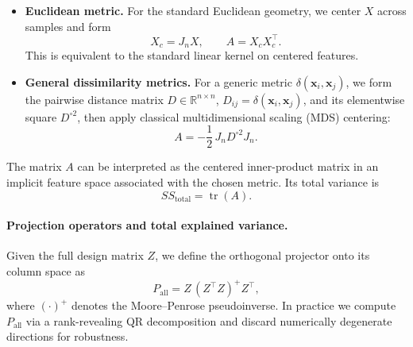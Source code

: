\documentclass[10pt,twocolumn,letterpaper]{article}
\begin{document}
\begin{itemize}
    \item \textbf{Euclidean metric.} For the standard Euclidean geometry, we center $X$ across samples and form
    \begin{equation}
        X_c = J_n X, \qquad
        A = X_c X_c^\top.
    \end{equation}
    This is equivalent to the standard linear kernel on centered features.
    
    
    \item \textbf{General dissimilarity metrics.} For a generic metric $\delta(\mathbf{x}_i,\mathbf{x}_j)$, we form the pairwise distance matrix $D \in \mathbb{R}^{n\times n}$, $D_{ij} = \delta(\mathbf{x}_i,\mathbf{x}_j)$, and its elementwise square $D^{\circ 2}$, then apply classical multidimensional scaling (MDS) centering:
    \begin{equation}
        A = -\frac{1}{2}\, J_n D^{\circ 2} J_n.
    \end{equation}
\end{itemize}

The matrix $A$ can be interpreted as the centered inner-product matrix in an implicit feature space associated with the chosen metric. Its total variance is
\begin{equation}
    SS_{\text{total}} = \operatorname{tr}(A).
\end{equation}

\paragraph{Projection operators and total explained variance.}
Given the full design matrix $Z$, we define the orthogonal projector onto its column space as
\begin{equation}
    P_{\text{all}} = Z\,(Z^\top Z)^+ Z^\top,
\end{equation}
where $(\cdot)^+$ denotes the Moore--Penrose pseudoinverse. In practice we compute $P_{\text{all}}$ via a rank-revealing QR decomposition and discard numerically degenerate directions for robustness.
\end{document}
